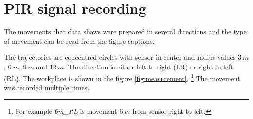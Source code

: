 






\chapter{PIR signal recording}
\label{appendix:PIRSignal}

The movements that data shows were prepared in several directions
and the type of movement can be read from the figure captions.

The trajectories are concentred circles with sensor in center and radius values $3~m$, $6~m$, $9~m$ and $12~m$.
The direction is either left-to-right (LR) or right-to-left (RL).
The workplace is shown in the figure \ref{fig:measurement}.
\footnote{For example {\it 6m\_RL} is movement $6~m$ from sensor right-to-left.}
The movement was recorded multiple times.

